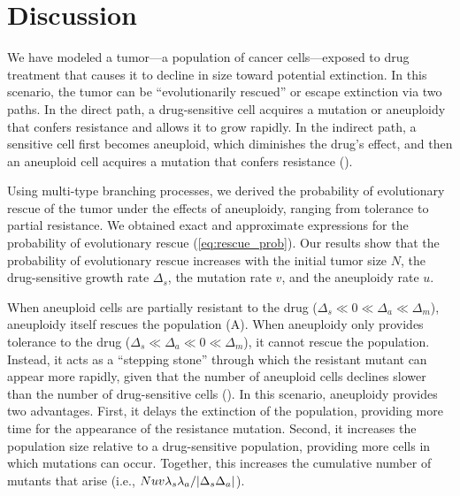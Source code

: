 \documentclass[12pt]{extarticle}
\begin{document}


\section*{Discussion}

We have modeled a tumor---a population of cancer cells---exposed to drug treatment that causes it to decline in size toward potential extinction.
In this scenario, the tumor can be ``evolutionarily rescued'' or escape extinction via two paths.
In the direct path, a drug-sensitive cell acquires a mutation or aneuploidy that confers resistance and allows it to grow rapidly.
In the indirect path, a sensitive cell first becomes aneuploid, which diminishes the drug's effect, and then an aneuploid cell acquires a mutation that confers resistance (). 

Using multi-type branching processes, we derived the probability of evolutionary rescue of the tumor under the effects of aneuploidy, ranging from tolerance to partial resistance.
We obtained exact and approximate expressions for the probability of evolutionary rescue (\cref{eq:rescue_prob}). 
Our results show that the probability of evolutionary rescue increases with the initial tumor size $N$, the drug-sensitive growth rate $\Delta_s$, the mutation rate $v$, and the aneuploidy rate $u$.

When aneuploid cells are partially resistant to the drug ($\Delta_s\ll0\ll\Delta_a\ll\Delta_m$), aneuploidy itself rescues the population (A). 
When aneuploidy only provides tolerance to the drug ($\Delta_s\ll\Delta_a\ll0\ll\Delta_m$), it cannot rescue the population.
Instead, it acts as a ``stepping stone'' through which the resistant mutant can appear more rapidly, given that the number of aneuploid cells declines slower than the number of drug-sensitive cells (). 
In this scenario, aneuploidy provides two advantages. First, it delays the extinction of the population, providing more time for the appearance of the resistance mutation. 
Second, it increases the population size relative to a drug-sensitive population, providing more cells in which mutations can occur. 
Together, this increases the cumulative number of mutants that arise (i.e., $N u v \lambda_s \lambda_a / \abs{\Delta_s \Delta_a}$). %
\end{document}
